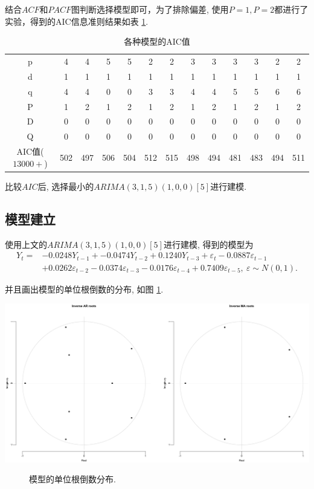 \documentclass[12pt]{article}
\begin{document}
\qquad 结合$ACF$和$PACF$图判断选择模型即可，为了排除偏差, 使用$P=1,P=2$都进行了实验，得到的AIC信息准则结果如表 \ref{tab:my-table2}. 
\begin{table}[htbp]
    \centering
    \caption{各种模型的AIC值}
    \label{tab:my-table2}
    \begin{tabular}{c|cccccccccccc}
    \hline
    p & 4 & 4 & 5 & 5 & 2 & 2 & 3 & 3 & 3 & 3 & 2 & 2 \\
    d & 1 & 1 & 1 & 1 & 1 & 1 & 1 & 1 & 1 & 1 & 1 & 1 \\
    q & 4 & 4 & 0 & 0 & 3 & 3 & 4 & 4 & 5 & 5 & 6 & 6 \\
    P & 1 & 2 & 1 & 2 & 1 & 2 & 1 & 2 & 1 & 2 & 1 & 2 \\
    D & 0 & 0 & 0 & 0 & 0 & 0 & 0 & 0 & 0 & 0 & 0 & 0 \\
    Q & 0 & 0 & 0 & 0 & 0 & 0 & 0 & 0 & 0 & 0 & 0 & 0 \\ \hline
    AIC值($13000+$) & 502 & 497 & 506 & 504 & 512 & 515 & 498 & 494 & 481 & 483 & 494 & 511 \\ \hline
    \end{tabular}
\end{table}

比较$AIC$后, 选择最小的$ARIMA(3,1,5)(1,0,0)[5]$进行建模. 
\subsection{模型建立}
\qquad 使用上文的$ARIMA(3,1,5)(1,0,0)[5]$进行建模, 得到的模型为
\[
    \begin{aligned}
        Y_{t}=&-0.0248 Y_{t-1}+-0.0474 Y_{t-2}+ 0.1240 Y_{t-3}+\varepsilon_{t}-0.0887\varepsilon_{t-1}\\&+0.0262\varepsilon_{t-2}-0.0374\varepsilon_{t-3}-0.0176\varepsilon_{t-4}+0.7409\varepsilon_{t-5},\ \varepsilon\sim N(0,1).
    \end{aligned}
\]

并且画出模型的单位根倒数的分布, 如图 \ref{fig:m1r}.
\begin{center}
    \includegraphics[width=.6\textwidth]{m1}
\end{center}
\begin{figure}[htbp]
    \centering
    \caption{模型的单位根倒数分布. \label{fig:m1r}}
\end{figure}
\end{document}
